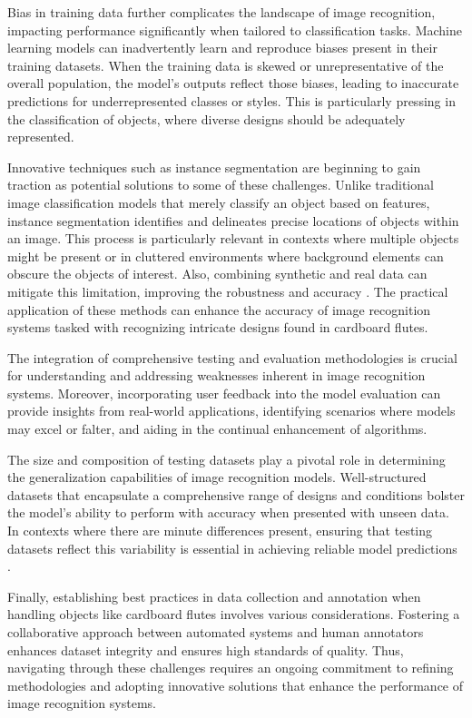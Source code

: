 Bias in training data further complicates the landscape of image recognition, impacting performance significantly when tailored to classification tasks. Machine learning models can inadvertently learn and reproduce biases present in their training datasets. When the training data is skewed or unrepresentative of the overall population, the model's outputs reflect those biases, leading to inaccurate predictions for underrepresented classes or styles. This is particularly pressing in the classification of objects, where diverse designs should be adequately represented. 


Innovative techniques such as instance segmentation are beginning to gain traction as potential solutions to some of these challenges. Unlike traditional image classification models that merely classify an object based on features, instance segmentation identifies and delineates precise locations of objects within an image. This process is particularly relevant in contexts where multiple objects might be present or in cluttered environments where background elements can obscure the objects of interest. Also, combining synthetic and real data can mitigate this limitation, improving the robustness and accuracy \cite{he2017mask}. The practical application of these methods can enhance the accuracy of image recognition systems tasked with recognizing intricate designs found in cardboard flutes.


The integration of comprehensive testing and evaluation methodologies is crucial for understanding and addressing weaknesses inherent in image recognition systems. Moreover, incorporating user feedback into the model evaluation can provide insights from real-world applications, identifying scenarios where models may excel or falter, and aiding in the continual enhancement of algorithms.


The size and composition of testing datasets play a pivotal role in determining the generalization capabilities of image recognition models. Well-structured datasets that encapsulate a comprehensive range of designs and conditions bolster the model's ability to perform with accuracy when presented with unseen data. In contexts where there are minute differences present, ensuring that testing datasets reflect this variability is essential in achieving reliable model predictions \cite{zhao2019object}.


Finally, establishing best practices in data collection and annotation when handling objects like cardboard flutes involves various considerations. Fostering a collaborative approach between automated systems and human annotators enhances dataset integrity and ensures high standards of quality. Thus, navigating through these challenges requires an ongoing commitment to refining methodologies and adopting innovative solutions that enhance the performance of image recognition systems.


